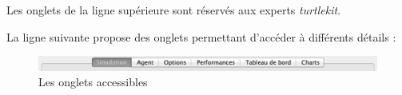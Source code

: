 \documentclass[a4paper,oneside,12 pt]{article}
\begin{document}
\begin{itemize}
\end{itemize}




Les onglets de la ligne supérieure sont réservés aux experts \textit{turtlekit}.



La ligne suivante propose des onglets permettant d'accéder à différents détails :
\begin{figure}[hbtp]
\begin{center}
 \includegraphics [scale=0.5] {Onglets.pdf}
\end{center}
 \caption{Les onglets accessibles }
\end{figure}
\end{document}
